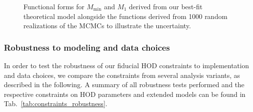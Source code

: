 \documentclass[a4paper,11pt]{article}
\begin{document}
\begin{figure}
\begin{center}
\caption{Functional forms for $M_{\mathrm{min}}$ and $M_{1}$ derived from our best-fit theoretical model alongside the functions derived from 1000 random realizations of the MCMCs to illustrate the uncertainty.} 
\label{fig:hod-params-z-dep}
\end{center}
\end{figure}

\subsubsection{Robustness to modeling and data choices}

In order to test the robustness of our fiducial HOD constraints to implementation and data choices, we compare the constraints from several analysis variants, as described in the following. A summary of all robustness tests performed and the respective constraints on HOD parameters and extended models can be found in Tab.~\ref{tab:constraints_robustness}.
\end{document}
